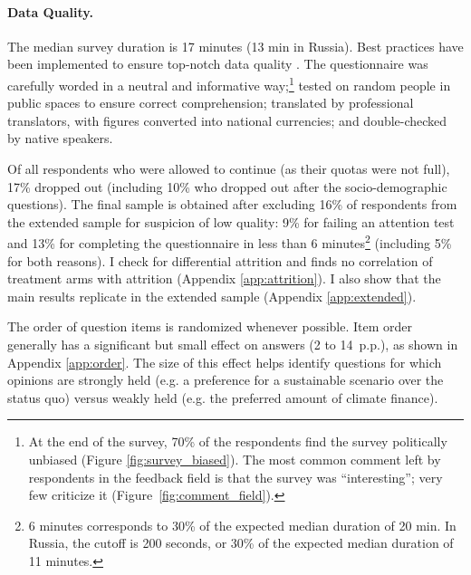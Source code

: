 \documentclass[12pt,english]{article}
\begin{document}
\begin{bibunit}
\paragraph{Data Quality.}\label{par:data_quality}
The median survey duration is 17 minutes (13 min in Russia). 
Best practices have been implemented  to ensure top-notch data quality \citep{stantcheva_how_2023}. 
The questionnaire was carefully worded in a neutral and informative way;\footnote{At the end of the survey, 70\% of the respondents find the survey politically unbiased (Figure \ref{fig:survey_biased}). The most common comment left by respondents in the feedback field is that the survey was ``interesting''; very few criticize it (Figure~\ref{fig:comment_field}).} tested on random people in public spaces to ensure correct comprehension; translated by professional translators, with figures converted into national currencies; and double-checked by native speakers.

Of all respondents who %
were allowed to continue (as their quotas were not full), %
17\% dropped out (including 10\% who dropped out after the socio-demographic questions). The final sample is obtained after excluding 16\% of respondents from the extended sample for suspicion of low quality: 9\% for failing an attention test and 13\% for completing the questionnaire in less than 6 minutes\footnote{6 minutes corresponds to 30\% of the expected median duration of 20 min. In Russia, the cutoff is 200 seconds, or 30\% of the expected median duration of 11 minutes.} (including 5\% for both reasons). 
I check for differential attrition and finds no correlation of treatment arms with attrition (Appendix \ref{app:attrition}). I also show that the main results replicate in the extended sample (Appendix \ref{app:extended}). 

The order of question items is randomized whenever possible. 
Item order generally has a significant but small effect on answers (2 to 14~p.p.), as shown in Appendix \ref{app:order}. The size of this effect helps identify questions for which opinions are strongly held (e.g. a preference for a sustainable scenario over the status quo) versus weakly held (e.g. the preferred amount of climate finance). %


\end{bibunit}
\end{document}
